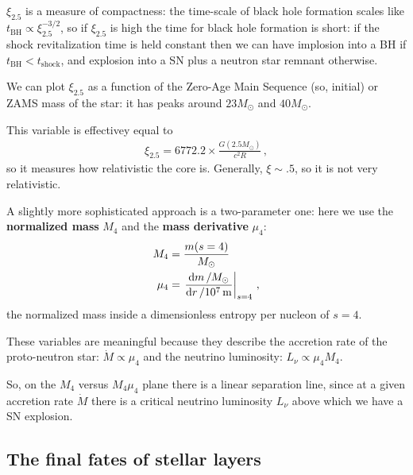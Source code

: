 \documentclass[main.tex]{subfiles}
\begin{document}
\(\xi_{2.5} \) is a measure of compactness: the time-scale of black hole formation scales like \(t _{\text{BH}} \propto \xi_{2.5}^{-3/2}\), so if \(\xi_{2.5}\) is high the time for black hole formation is short: if the shock revitalization time is held constant then we can have implosion into a BH if \(t _{\text{BH}} < t _{\text{shock}}\), and explosion into a SN plus a neutron star remnant otherwise.


We can plot \(\xi_{2.5}\) as a function of the Zero-Age Main Sequence (so, initial) or ZAMS mass of the star: it has peaks around \(23 M_{\odot}\) and \(40 M_{\odot}\).

\begin{bluebox}
This variable is effectivey equal to 
%
\begin{align}
\xi_{2.5} = 6772.2 \times \frac{G (2.5 M_{\odot})}{c^2 R}
\,,
\end{align}
%
so it measures how relativistic the core is. Generally, \(\xi \sim \num{.5}\), so it is not very relativistic.
\end{bluebox}

A slightly more sophisticated approach is a two-parameter one: here we use the \textbf{normalized mass} \(M_{4}\) and the \textbf{mass derivative} \(\mu_{4}\):
%
\begin{subequations}
\begin{align}
M_4 &= \frac{m(s=4)}{M_{\odot}} \\
\mu_{4} &= \eval{\frac{ \dd{m} / M_{\odot}}{ \dd{r} / \SI{e7}{m}}}_{s=4}
\,,
\end{align}
\end{subequations}
%
the normalized mass inside a dimensionless entropy per nucleon of \(s=4\).  

These variables are meaningful because they describe the accretion rate of the proto-neutron star: \(\dot{M} \propto \mu_4 \) and the neutrino luminosity: \(L_{\nu } \propto \mu_4 M_4 \).

So, on the \(M_4 \) versus \(M_4 \mu_4 \) plane there is a linear separation line, since at a given accretion rate \(\dot{M}\) there is a critical neutrino luminosity \(L_{\nu }\) above which we have a SN explosion.

\subsection{The final fates of stellar layers}
\end{document}
